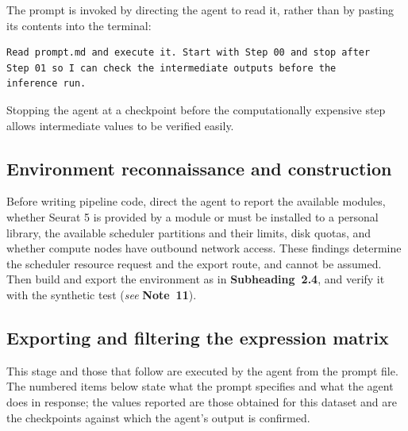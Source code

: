 \documentclass[11pt,a4paper]{article}
\newcommand{\seenote}[1]{(\textit{see} \textbf{Note~#1})}
\begin{document}
The prompt is invoked by directing the agent to read it, rather than by pasting its contents into the terminal:

\begin{lstlisting}
Read prompt.md and execute it. Start with Step 00 and stop after
Step 01 so I can check the intermediate outputs before the
inference run.
\end{lstlisting}

Stopping the agent at a checkpoint before the computationally expensive step allows intermediate values to be verified easily.

\subsection{Environment reconnaissance and construction}

Before writing pipeline code, direct the agent to report the available modules, whether Seurat 5 is provided by a module or must be installed to a personal library, the available scheduler partitions and their limits, disk quotas, and whether compute nodes have outbound network access. These findings determine the scheduler resource request and the export route, and cannot be assumed. Then build and export the environment as in \textbf{Subheading~2.4}, and verify it with the synthetic test \seenote{11}.

\subsection{Exporting and filtering the expression matrix}

This stage and those that follow are executed by the agent from the prompt file. The numbered items below state what the prompt specifies and what the agent does in response; the values reported are those obtained for this dataset and are the checkpoints against which the agent's output is confirmed.
\end{document}
